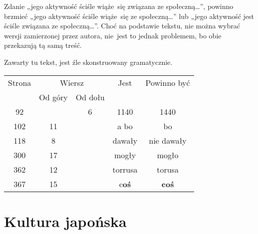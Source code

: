 \documentclass[a4paper,11pt]{article}
\numberwithin{equation}{section}
\begin{document}
\vspace{0em}



\vspace{0em}


\noindent
{} Zdanie „jego aktywność ściśle wiąże~się
związana ze społeczną\ldots”, powinno brzmieć „jego aktywność ściśle
wiąże~się ze społeczną\ldots” lub „jego aktywność jest ściśle
związana ze społeczną\ldots”. Choć na podstawie tekstu, nie można
wybrać wersji zamierzonej przez autora, nie~jest to jednak problemem,
bo obie przekazują tą samą treść.

\VerSpaceFour





 Zawarty tu tekst, jest źle skonstruowany
gramatycznie.







\begin{center}

  \begin{tabular}{|c|c|c|c|c|}
    \hline
    Strona & \multicolumn{2}{c|}{Wiersz} & Jest
                              & Powinno być \\ \cline{2-3}
    & Od góry & Od dołu & & \\
    \hline
    92  & &  6 & 1140 & 1440 \\
    102 & 11 & & a bo & bo \\
    118 &  8 & & dawały & nie dawały \\
    300 & 17 & & mogły & mogło \\
    362 & 12 & & torrusa & torusa \\
    367 & 15 & & c\textbf{oś} & \textbf{coś} \\
    \hline
  \end{tabular}

\end{center}


\VerSpaceTwo










\section{Kultura japońska}
\end{document}
